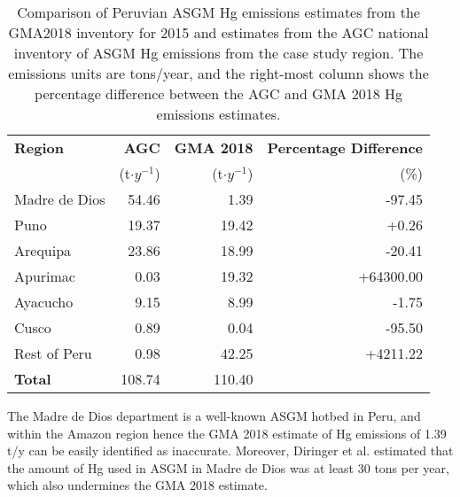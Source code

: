 \setlength{\tabcolsep}{5pt}
\begin{table}[H]
  \begin{center}
    \caption[Comparison of Peruvian ASGM Hg emissions estimates from the GMA2018 inventory for 2015 and estimates from the AGC national inventory of ASGM Hg emissions]{Comparison of Peruvian ASGM Hg emissions estimates from the GMA2018 inventory for 2015 and estimates from the AGC national inventory of ASGM Hg emissions from the case study region. The emissions units are tons/year, and the right-most column shows the percentage difference between the AGC and GMA 2018 Hg emissions estimates. }
    \label{tab:agc_vs_gma18}
    \begin{tabular}{lrrr}
      
    \textbf{Region}     & \textbf{AGC}      & \textbf{GMA 2018}             & \textbf{Percentage Difference}       \\
                        & (t$\cdot y^{-1}$) & (t$\cdot y^{-1}$)                    &        (\%)\\
\hline    
    Madre de Dios       & 54.46             & 1.39                          &    -97.45       \\
    Puno                & 19.37             & 19.42                         &    +0.26     \\
    Arequipa            & 23.86             & 18.99                         &    -20.41       \\ %
    Apurimac            & 0.03              & 19.32                         &    +64300.00    \\
    Ayacucho            & 9.15              & 8.99                          &    -1.75           \\ %
    Cusco               & 0.89              & 0.04                          &    -95.50           \\
    Rest of Peru        &  0.98             & 42.25                         &    +4211.22        \\
   
    \hline
    \textbf{Total}           &108.74           & 110.40      &        \\
    \end{tabular}
  \end{center}
\end{table}
\begin{flushleft}
The Madre de Dios department is a well-known ASGM hotbed in Peru, and within the Amazon region hence the GMA 2018 estimate of Hg emissions of 1.39 t/y can be easily identified as inaccurate. Moreover, Diringer et al.\cite{ding_w_dynamic_2020} estimated that the amount of Hg used in ASGM in Madre de Dios was at least 30 tons per year, which also undermines the GMA 2018 estimate. 

\end{flushleft}

